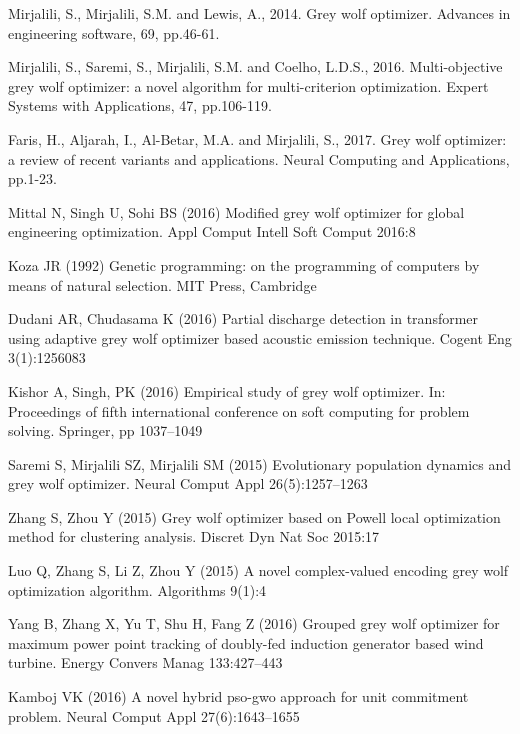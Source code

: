 \begin{thebibliography}{9}

Mirjalili, S., Mirjalili, S.M. and Lewis, A., 2014. Grey wolf optimizer. Advances in engineering software, 69, pp.46-61.
 
Mirjalili, S., Saremi, S., Mirjalili, S.M. and Coelho, L.D.S., 2016. Multi-objective grey wolf optimizer: a novel algorithm for multi-criterion optimization. Expert Systems with Applications, 47, pp.106-119.
 
Faris, H., Aljarah, I., Al-Betar, M.A. and Mirjalili, S., 2017. Grey wolf optimizer: a review of recent variants and applications. Neural Computing and Applications, pp.1-23.

Mittal N, Singh U, Sohi BS (2016) Modified grey wolf optimizer
for global engineering optimization. Appl Comput Intell Soft
Comput 2016:8

Koza JR (1992) Genetic programming: on the programming of
computers by means of natural selection. MIT Press, Cambridge

Dudani AR, Chudasama K (2016) Partial discharge detection in
transformer using adaptive grey wolf optimizer based acoustic
emission technique. Cogent Eng 3(1):1256083

Kishor A, Singh, PK (2016) Empirical study of grey wolf
optimizer. In: Proceedings of fifth international conference on
soft computing for problem solving. Springer, pp 1037–1049

Saremi S, Mirjalili SZ, Mirjalili SM (2015) Evolutionary population
dynamics and grey wolf optimizer. Neural Comput Appl
26(5):1257–1263

Zhang S, Zhou Y (2015) Grey wolf optimizer based on Powell
local optimization method for clustering analysis. Discret Dyn
Nat Soc 2015:17

Luo Q, Zhang S, Li Z, Zhou Y (2015) A novel complex-valued
encoding grey wolf optimization algorithm. Algorithms 9(1):4

Yang B, Zhang X, Yu T, Shu H, Fang Z (2016) Grouped grey
wolf optimizer for maximum power point tracking of doubly-fed
induction generator based wind turbine. Energy Convers Manag
133:427–443

Kamboj VK (2016) A novel hybrid pso-gwo approach for unit
commitment problem. Neural Comput Appl 27(6):1643–1655


\end{thebibliography}
